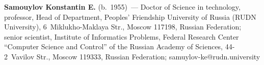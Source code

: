   \vspace*{3pt}
  
  \noindent
  \textbf{Samouylov Konstantin E.} (b.\ 1955)~--- Doctor of Science in technology, professor, Head of 
Department,  Peoples' Friendship 
University of Russia (RUDN University), 6~Miklukho-Maklaya Str., Moscow 117198, Russian 
Federation; senior scientist, Institute of Informatics Problems, Federal Research Center ``Computer 
Science and Control'' of the Russian Academy of Sciences, 44-2~Vavilov Str., Moscow 119333, Russian 
Federation; 
  \mbox{samuylov-ke@rudn.university}
  
\label{end\stat}

\renewcommand{\bibname}{\protect\rm Литература} 
  
  